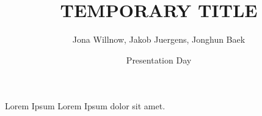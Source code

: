 \documentclass{beamer}
\title{{\color{red} TEMPORARY TITLE}}
\author{Jona Willnow, Jakob Juergens, Jonghun Baek}
\date{{\color{red}}Presentation Day}
\begin{document}
	
	\begin{frame}
		\titlepage 
	\end{frame}
	
	\logo{}
	
	
	\begin{frame}{Lorem Ipsum}
		Lorem Ipsum dolor sit amet.
	\end{frame}
	
\end{document}
